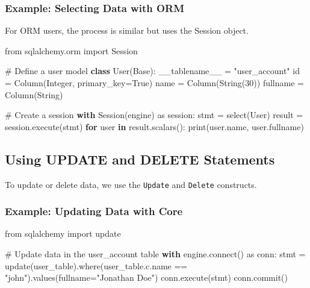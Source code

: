 \documentclass[
  letterpaper,
  DIV=11,
  numbers=noendperiod]{scrreprt}
\newenvironment{Shaded}{\begin{snugshade}}{\end{snugshade}}
\newcommand{\BuiltInTok}[1]{\textcolor[rgb]{0.00,0.23,0.31}{#1}}
\newcommand{\CommentTok}[1]{\textcolor[rgb]{0.37,0.37,0.37}{#1}}
\newcommand{\ControlFlowTok}[1]{\textcolor[rgb]{0.00,0.23,0.31}{\textbf{#1}}}
\newcommand{\DecValTok}[1]{\textcolor[rgb]{0.68,0.00,0.00}{#1}}
\newcommand{\ExtensionTok}[1]{\textcolor[rgb]{0.00,0.23,0.31}{#1}}
\newcommand{\ImportTok}[1]{\textcolor[rgb]{0.00,0.46,0.62}{#1}}
\newcommand{\KeywordTok}[1]{\textcolor[rgb]{0.00,0.23,0.31}{\textbf{#1}}}
\newcommand{\NormalTok}[1]{\textcolor[rgb]{0.00,0.23,0.31}{#1}}
\newcommand{\OperatorTok}[1]{\textcolor[rgb]{0.37,0.37,0.37}{#1}}
\newcommand{\StringTok}[1]{\textcolor[rgb]{0.13,0.47,0.30}{#1}}
\newcommand{\VariableTok}[1]{\textcolor[rgb]{0.07,0.07,0.07}{#1}}
\begin{document}
\subsubsection{Example: Selecting Data with
ORM}\label{example-selecting-data-with-orm}

For ORM users, the process is similar but uses the Session object.

\begin{Shaded}
\begin{Highlighting}[]
\ImportTok{from}\NormalTok{ sqlalchemy.orm }\ImportTok{import}\NormalTok{ Session}

\CommentTok{\# Define a user model}
\KeywordTok{class}\NormalTok{ User(Base):}
\NormalTok{    \_\_tablename\_\_ }\OperatorTok{=} \StringTok{"user\_account"}
    \BuiltInTok{id} \OperatorTok{=}\NormalTok{ Column(Integer, primary\_key}\OperatorTok{=}\VariableTok{True}\NormalTok{)}
\NormalTok{    name }\OperatorTok{=}\NormalTok{ Column(String(}\DecValTok{30}\NormalTok{))}
\NormalTok{    fullname }\OperatorTok{=}\NormalTok{ Column(String)}

\CommentTok{\# Create a session}
\ControlFlowTok{with}\NormalTok{ Session(engine) }\ImportTok{as}\NormalTok{ session:}
\NormalTok{    stmt }\OperatorTok{=}\NormalTok{ select(User)}
\NormalTok{    result }\OperatorTok{=}\NormalTok{ session.execute(stmt)}
    \ControlFlowTok{for}\NormalTok{ user }\KeywordTok{in}\NormalTok{ result.scalars():}
        \BuiltInTok{print}\NormalTok{(user.name, user.fullname)}
\end{Highlighting}
\end{Shaded}

\subsection{Using UPDATE and DELETE
Statements}\label{using-update-and-delete-statements}

To update or delete data, we use the \texttt{Update} and \texttt{Delete}
constructs.

\subsubsection{Example: Updating Data with
Core}\label{example-updating-data-with-core}

\begin{Shaded}
\begin{Highlighting}[]
\ImportTok{from}\NormalTok{ sqlalchemy }\ImportTok{import}\NormalTok{ update}

\CommentTok{\# Update data in the user\_account table}
\ControlFlowTok{with}\NormalTok{ engine.}\ExtensionTok{connect}\NormalTok{() }\ImportTok{as}\NormalTok{ conn:}
\NormalTok{    stmt }\OperatorTok{=}\NormalTok{ update(user\_table).where(user\_table.c.name }\OperatorTok{==} \StringTok{"john"}\NormalTok{).values(fullname}\OperatorTok{=}\StringTok{"Jonathan Doe"}\NormalTok{)}
\NormalTok{    conn.execute(stmt)}
\NormalTok{    conn.commit()}
\end{Highlighting}
\end{Shaded}
\end{document}
